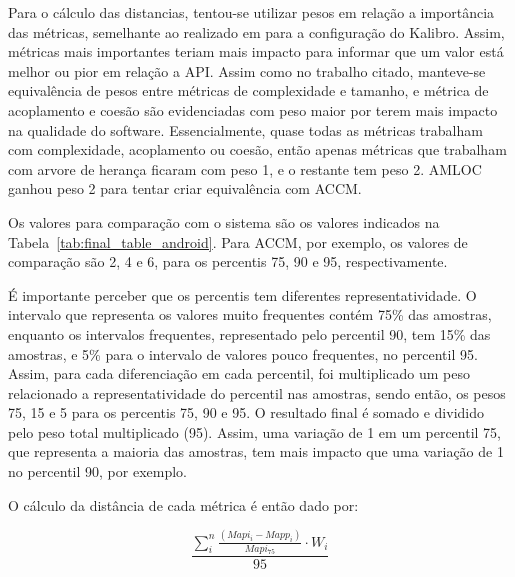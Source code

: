 
Para o cálculo das distancias, tentou-se utilizar pesos em relação a importância das métricas, semelhante ao realizado em  para a configuração do Kalibro. Assim, métricas mais importantes teriam mais impacto para informar que um valor está melhor ou pior em relação a API. Assim como no trabalho citado, manteve-se equivalência de pesos entre métricas de complexidade e tamanho, e métrica de acoplamento e coesão são evidenciadas com peso maior por terem mais impacto na qualidade do software. Essencialmente, quase todas as métricas trabalham com complexidade, acoplamento ou coesão, então apenas métricas que trabalham com arvore de herança ficaram com peso 1, e o restante tem peso 2. AMLOC ganhou peso 2 para tentar criar equivalência com ACCM.

Os valores para comparação com o sistema são os valores indicados na Tabela~\ref{tab:final_table_android}. Para ACCM, por exemplo, os valores de comparação são 2, 4 e 6, para os percentis 75, 90 e 95, respectivamente. 

É importante perceber que os percentis tem diferentes representatividade. O intervalo que representa os valores muito frequentes contém 75\% das amostras, enquanto os intervalos frequentes, representado pelo percentil 90, tem 15\% das amostras, e 5\% para o intervalo de valores pouco frequentes, no percentil 95. Assim, para cada diferenciação em cada percentil, foi multiplicado um peso relacionado a representatividade do percentil nas amostras, sendo então, os pesos 75, 15 e 5 para os percentis 75, 90 e 95. O resultado final é somado e dividido pelo peso total multiplicado (95). Assim, uma variação de 1 em um percentil 75, que representa a maioria das amostras, tem mais impacto que uma variação de 1 no percentil 90, por exemplo.

O cálculo da distância de cada métrica é então dado por:
\begin{center}
\begin{equation}\label{eq:distancia_metrica}
\displaystyle \frac{\sum_{i}^{n} \frac{(Mapi_i-Mapp_i)}{Mapi_{75}}\cdot W_i}{95}
\end{equation}
\end{center}

